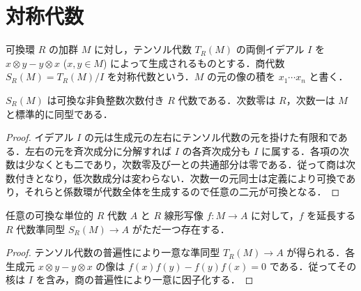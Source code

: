 \section{対称代数}
\begin{defn}[対称代数]
可換環 $R$ の加群 $M$ に対し，テンソル代数 $T_R(M)$ の両側イデアル $I$ を $x\otimes y-y\otimes x$ ($x,y\in M$) によって生成されるものとする．商代数 $S_R(M)=T_R(M)/I$ を対称代数という．$M$ の元の像の積を $x_1\cdots x_n$ と書く．
\end{defn}
\begin{prop}[対称代数の次数構造]
$S_R(M)$ は可換な非負整数次数付き $R$ 代数である．次数零は $R$，次数一は $M$ と標準的に同型である．
\end{prop}
\begin{proof}
イデアル $I$ の元は生成元の左右にテンソル代数の元を掛けた有限和である．左右の元を斉次成分に分解すれば $I$ の各斉次成分も $I$ に属する．各項の次数は少なくとも二であり，次数零及び一との共通部分は零である．従って商は次数付きとなり，低次数成分は変わらない．次数一の元同士は定義により可換であり，それらと係数環が代数全体を生成するので任意の二元が可換となる．
\end{proof}
\begin{prop}[対称代数の普遍性]
任意の可換な単位的 $R$ 代数 $A$ と $R$ 線形写像 $f:M\to A$ に対して，$f$ を延長する $R$ 代数準同型 $S_R(M)\to A$ がただ一つ存在する．
\end{prop}
\begin{proof}
テンソル代数の普遍性により一意な準同型 $T_R(M)\to A$ が得られる．各生成元 $x\otimes y-y\otimes x$ の像は $f(x)f(y)-f(y)f(x)=0$ である．従ってその核は $I$ を含み，商の普遍性により一意に因子化する．
\end{proof}
